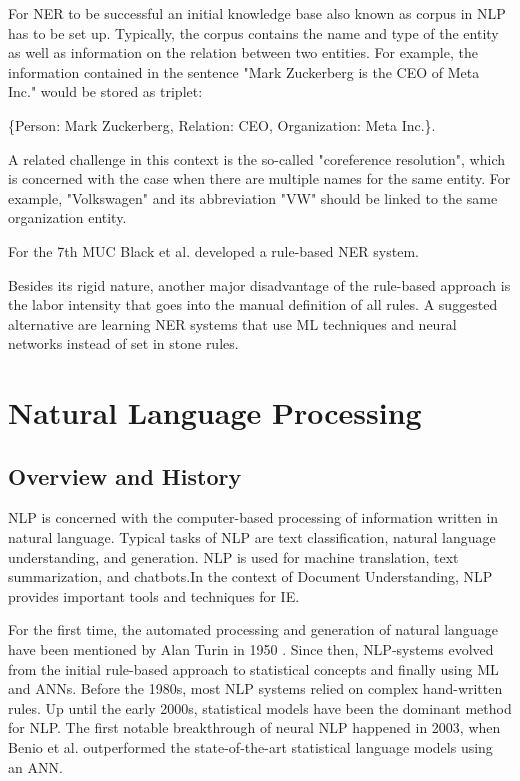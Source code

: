 For \ac{NER} to be successful an initial knowledge base also known as corpus in \ac{NLP} has to be set up. Typically, the corpus contains the name and type of the entity as well as information on the relation between two entities. For example, the information contained in the sentence "Mark Zuckerberg is the CEO of Meta Inc." would be stored as triplet: 

\{Person: Mark Zuckerberg, Relation: CEO, Organization: Meta Inc.\}.

A related challenge in this context is the so-called "coreference resolution", which is concerned with the case when there are multiple names for the same entity. For example, "Volkswagen" and its abbreviation "VW" should be linked to the same organization entity.
\cite{cowie1996information,cardie1997empirical}

For the 7th \ac{MUC} Black et al.\cite{black1998facile} developed a rule-based \ac{NER} system.

Besides its rigid nature, another major disadvantage of the rule-based approach is the labor intensity that goes into the manual definition of all rules. A suggested alternative are learning \ac{NER} systems that use \ac{ML} techniques and neural networks instead of set in stone rules.
\cite{hobbs2010information}

\newpage
\section{Natural Language Processing}
\subsection{Overview and History}
\ac{NLP} is concerned with the computer-based processing of information written in natural language. Typical tasks of \ac{NLP} are text classification, natural language understanding, and generation. \ac{NLP} is used for machine translation, text summarization, and chatbots.In the context of Document Understanding, \ac{NLP} provides important tools and techniques for \acf{IE}. \cite{aiello2002document}

For the first time, the automated processing and generation of natural language have been mentioned by Alan Turin in 1950 \cite{Turing1950}. Since then, \ac{NLP}-systems evolved from the initial rule-based approach to statistical concepts and finally using \ac{ML} and \acfp{ANN}. Before the 1980s, most \ac{NLP} systems relied on complex hand-written rules. Up until the early 2000s, statistical models have been the dominant method for \ac{NLP}. The first notable breakthrough of neural \ac{NLP} happened in 2003, when Benio et al. \cite{bengio} outperformed the state-of-the-art statistical language models using an \ac{ANN}.

